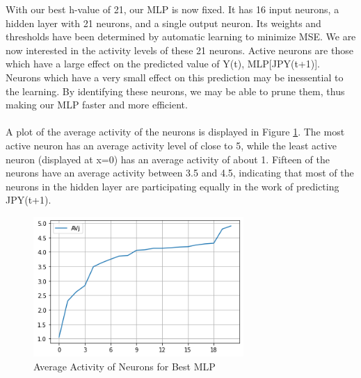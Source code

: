 \documentclass{homework}
\begin{document}
With our best h-value of 21, our MLP is now fixed. It has 16 input neurons, a hidden layer with 21 neurons, and a single output neuron. Its weights and thresholds have been determined by automatic learning to minimize MSE. We are now interested in the activity levels of these 21 neurons. Active neurons are those which have a large effect on the predicted value of Y(t), MLP[JPY(t+1)]. Neurons which have a very small effect on this prediction may be inessential to the learning. By identifying these neurons, we may be able to prune them, thus making our MLP faster and more efficient.\\\\
A plot of the average activity of the neurons is displayed in Figure \ref{neurons}. The most active neuron has an average activity level of close to 5, while the least active neuron (displayed at x=0) has an average activity of about 1. Fifteen of the neurons have an average activity between 3.5 and 4.5, indicating that most of the neurons in the hidden layer are participating equally in the work of predicting JPY(t+1). 

\begin{figure}[H]
    \centering
    \includegraphics[width=8cm]{h21_neurons.png}
    \caption{Average Activity of Neurons for Best MLP}
    \label{neurons}
\end{figure}

\begin{table}[H]
    \centering
    \\
    \caption{Most and Least Active Neurons}
    \label{neurons}
\end{table}
\end{document}
